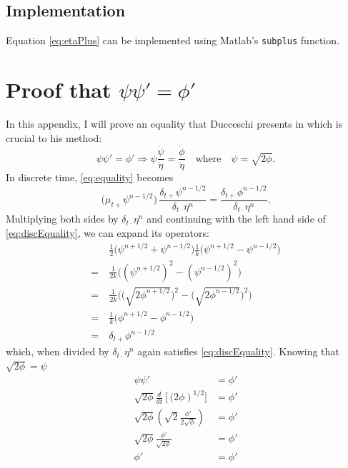 \documentclass{article}
\begin{document}
\subsection{Implementation}
Equation \eqref{eq:etaPlus} can be implemented using Matlab's \texttt{subplus} function.



\appendix
\section{Proof that $\psi\psi' = \phi'$}\label{app:phiPsiProof}
In this appendix, I will prove an equality that Ducceschi presents in \cite{Ducceschi2019} which is crucial to his method:
\begin{equation}\label{eq:equality}
    \psi\psi' = \phi' \Rightarrow \psi\frac{\dot{\psi}}{\dot{\eta}} = \frac{\dot{\phi}}{\dot\eta}\quad \text{where}\quad \psi = \sqrt{2\phi}.
\end{equation}
In discrete time, \eqref{eq:equality} becomes
\begin{equation}\label{eq:discEquality}
    \big(\mu_{t+}\psi^{n-1/2}\big)\,\frac{\delta_{t+}\psi^{n-1/2}}{\delta_{t\cdot}\eta^n} = \frac{\delta_{t+}\phi^{n-1/2}}{\delta_{t\cdot}\eta^n}. 
\end{equation}
Multiplying both sides by $\delta_{t\cdot} \eta^n$ and continuing with the left hand side of \eqref{eq:discEquality}, we can expand its operators:
\begin{equation}
    \begin{aligned}\nonumber
        &\frac{1}{2}\big(\psi^{n+1/2}+\psi^{n-1/2}\big)\frac{1}{k}\big(\psi^{n+1/2}-\psi^{n-1/2}\big) \\
        =\ &\frac{1}{2k}\Big((\psi^{n+1/2})^2 - (\psi^{n-1/2})^2\Big)\\
        =\ &\frac{1}{2k}\bigg(\Big(\sqrt{2\phi^{n+1/2}}\Big)^2 - \Big(\sqrt{2\phi^{n-1/2}}\Big)^2\bigg)\\
        =\ &\frac{1}{k}\Big(\phi^{n+1/2} - \phi^{n-1/2}\Big)\\
        =\ &\delta_{t+}\phi^{n-1/2}
    \end{aligned}
\end{equation}
which, when divided by $\delta_{t\cdot}\eta^n$ again satisfies \eqref{eq:discEquality}.
Knowing that $\sqrt{2\phi}=\psi$
\begin{equation}
    \begin{aligned}
        \psi\psi' &= \phi'\\
        \sqrt{2\phi}\frac{d}{dt}\left[(2\phi\right)^{1/2}] &= \phi'\\
        \sqrt{2\phi}\left(\sqrt{2}\frac{\phi'}{2\sqrt{\phi}}\right) &= \phi'\\
        \sqrt{2\phi}\frac{\phi'}{\sqrt{2\phi}} &= \phi'\\
        \phi' &= \phi'
    \end{aligned}
\end{equation}
\end{document}
